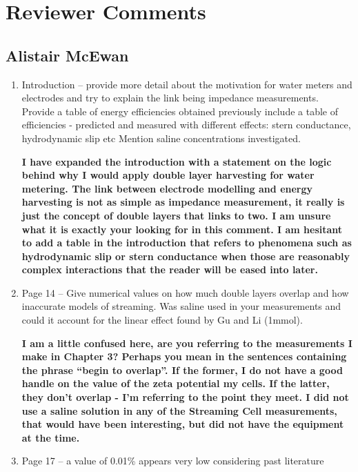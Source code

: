 
\chapter*{Reviewer Comments}
\section*{Alistair McEwan}
\begin{enumerate}
  \item Introduction -- provide more detail about the motivation for water meters and electrodes and try to explain the link being impedance measurements. Provide a table of energy efficiencies obtained previously include a table of efficiencies - predicted and measured with different effects: stern conductance, hydrodynamic slip etc Mention saline concentrations investigated.

    \textbf{\textcolor{OliveGreen}{
      I have expanded the introduction with a statement on the logic behind why I would apply double layer harvesting for water metering.
      The link between electrode modelling and energy harvesting is not as simple as impedance measurement, it really is just the concept of double layers that links to two.
      I am unsure what it is exactly your looking for in this comment.
      I am hesitant to add a table in the introduction that refers to phenomena such as hydrodynamic slip or stern conductance when those are reasonably complex interactions that the reader will be eased into later.
    }}

  \item Page 14 -- Give numerical values on how much double layers overlap and how inaccurate models of streaming. Was saline used in your measurements and could it account for the linear effect found by Gu and Li  (1mmol).

    \textbf{\textcolor{OliveGreen}{
      I am a little confused here, are you referring to the measurements I make in Chapter 3?
      Perhaps you mean in the sentences containing the phrase ``begin to overlap''.
      If the former, I do not have a good handle on the value of the zeta potential my cells.
      If the latter, they don't overlap - I'm referring to the point they meet.
      I did not use a saline solution in any of the Streaming Cell measurements, that would have been interesting, but did not have the equipment at the time.
    }}

  \item Page 17 -- a value of 0.01\% appears very low considering past literature


\end{enumerate}
